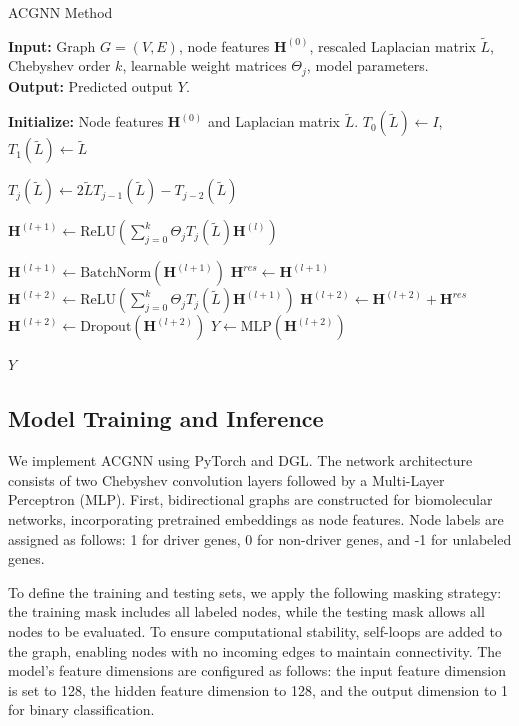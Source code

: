 \begin{algorithm}
	\caption{ACGNN Method}
	\label{alg:acgnn}
	\textbf{Input:} Graph \( G = (V, E) \), node features \( \mathbf{H}^{(0)} \), rescaled Laplacian matrix \( \tilde{L} \), Chebyshev order \( k \), learnable weight matrices \( \Theta_j \), model parameters.\\
	\textbf{Output:} Predicted output \( Y \).
	
	\begin{algorithmic}[1]
		\State \textbf{Initialize:} Node features \( \mathbf{H}^{(0)} \) and Laplacian matrix \( \tilde{L} \).
		\State \( T_0(\tilde{L}) \leftarrow I \), \( T_1(\tilde{L}) \leftarrow \tilde{L} \)
		
		 
		\State \( T_j(\tilde{L}) \leftarrow 2\tilde{L} T_{j-1}(\tilde{L}) - T_{j-2}(\tilde{L}) \)
		\EndFor
		
		\State \(\mathbf{H}^{(l+1)} \leftarrow \text{ReLU}\left( \sum_{j=0}^{k} \Theta_j T_j(\tilde{L}) \mathbf{H}^{(l)} \right) \)
		
		\State \(\mathbf{H}^{(l+1)} \gets \text{BatchNorm}(\mathbf{H}^{(l+1)})\)
		\State \(\mathbf{H}^{res} \gets \mathbf{H}^{(l+1)}\)  
		\State \(\mathbf{H}^{(l+2)} \gets \text{ReLU}\left( \sum_{j=0}^{k} \Theta_j T_j(\tilde{L}) \mathbf{H}^{(l+1)} \right) \)
		\State \(\mathbf{H}^{(l+2)} \gets \mathbf{H}^{(l+2)} + \mathbf{H}^{res} \) 
		\State \(\mathbf{H}^{(l+2)} \gets \text{Dropout}(\mathbf{H}^{(l+2)})\)
		\State \( Y \gets \text{MLP}(\mathbf{H}^{(l+2)}) \)
		
		\State \Return \( Y \)
	\end{algorithmic}
\end{algorithm}


\subsection{Model Training and Inference}
	We implement ACGNN using PyTorch and DGL. The network architecture consists of two Chebyshev convolution layers followed by a Multi-Layer Perceptron (MLP). First, bidirectional graphs are constructed for biomolecular networks, incorporating pretrained embeddings as node features. Node labels are assigned as follows: 1 for driver genes, 0 for non-driver genes, and -1 for unlabeled genes.
	
	To define the training and testing sets, we apply the following masking strategy: the training mask includes all labeled nodes, while the testing mask allows all nodes to be evaluated. To ensure computational stability, self-loops are added to the graph, enabling nodes with no incoming edges to maintain connectivity. The model's feature dimensions are configured as follows: the input feature dimension is set to 128, the hidden feature dimension to 128, and the output dimension to 1 for binary classification.

